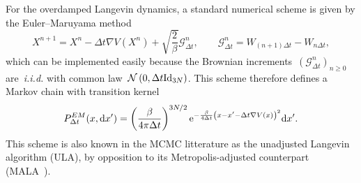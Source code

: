 For the overdamped Langevin dynamics, a standard numerical scheme is given by the Euler--Maruyama method
\begin{equation}
    X^{n+1} = X^n - \Delta t\nabla V(X^n) + \sqrt{\frac{2}{\beta}}\mathcal G^{n}_{\Delta t},\qquad \mathcal G^{n}_{\Delta t}=W_{(n+1)\Delta t}-W_{n\Delta t},
\end{equation}
which can be implemented easily because the Brownian increments~$(\mathcal G_{\Delta t}^{n})_{n\geq 0}$ are~\textit{i.i.d.} with common law~$\mathcal N\left(0,\Delta t \mathrm{Id}_{3N}\right)$.
This scheme therefore defines a Markov chain with transition kernel
\begin{equation}
    P_{\Delta t}^{EM}(x,\mathrm{d} x') = \left(\frac{\beta}{4\pi\Delta t}\right)^{3N/2}\mathrm{e}^{-\frac{\beta}{4\Delta t}\left(x-x'-\Delta t\nabla V(x)\right)^2}\mathrm{d} x'.
\end{equation}
This scheme is also known in the MCMC litterature as the unadjusted  Langevin algorithm (ULA), by opposition to its Metropolis-adjusted counterpart (MALA~\cite{RDF78,RR98}).

